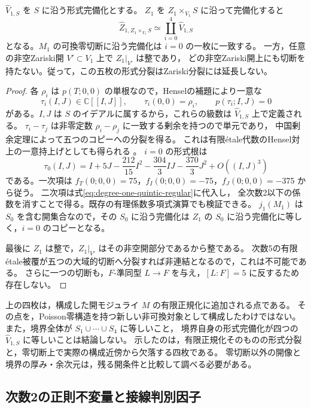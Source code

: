 \begin{corollary}[全零切断に沿う形式分裂]
\label{cor:degree-one-formal-five-splitting}
$\widehat V_{1,S}$ を $S$ に沿う形式完備化とする。
$Z_1$ を $Z_1\times_{V_1}S$ に沿って完備化すると
\[
 \widehat Z_{1,Z_1\times_{V_1}S}
          \simeq\coprod_{i=0}^4\widehat V_{1,S}
\]
となる。$M_1$ の可換零切断に沿う完備化は $i=0$ の一枚に一致する。
一方，任意の非空Zariski開 $V'\subset V_1$ 上で $Z_1|_{V'}$ は整であり，
どの非空Zariski開上にも切断を持たない。従って，この五枚の形式分裂はZariski分裂には延長しない。
\end{corollary}
\begin{proof}
各 $\rho_i$ は $p(T;0,0)$ の単根なので，Henselの補題により一意な
\[
 \tau_i(I,J)\in\mathbb C[[I,J]],\qquad
 \tau_i(0,0)=\rho_i,\qquad p(\tau_i;I,J)=0
\]
がある。$I,J$ は $S$ のイデアルに属するから，これらの級数は
$\widehat V_{1,S}$ 上で定義される。
$\tau_i-\tau_j$ は非零定数 $\rho_i-\rho_j$ に一致する剰余を持つので単元であり，
中国剰余定理によって五つのコピーへの分裂を得る。
これは有限\'{e}tale代数のHensel対上の一意持上げとしても得られる
\cite[Tags 0ALJ, 09ZL]{StacksProject}。
$i=0$ の形式根は
\[
 \tau_0(I,J)=I+5J-\frac{212}{15}I^2-\frac{304}{3}IJ-\frac{370}{3}J^2+O((I,J)^3)
\]
である。一次項は $f_T(0;0,0)=75$，$f_I(0;0,0)=-75$，$f_J(0;0,0)=-375$ から従う。
二次項は式\eqref{eq:degree-one-quintic-regular}に代入し，
全次数2以下の係数を消すことで得る。既存の有理係数多項式演算でも検証できる。
$j_1(M_1)$ は $S_0$ を含む開集合なので，その $S_0$ に沿う完備化は
$Z_1$ の $S_0$ に沿う完備化に等しく，$i=0$ のコピーとなる。

最後に $Z_1$ は整で，$Z_1|_{V'}$ はその非空開部分であるから整である。
次数5の有限\'{e}tale被覆が五つの大域的切断へ分裂すれば非連結となるので，これは不可能である。
さらに一つの切断も，$F$-準同型 $L\to F$ を与え，$[L:F]=5$ に反するため存在しない。
\end{proof}

\begin{remark}[有限正規化の境界としての意味]
上の四枚は，構成した開モジュライ $M$ の有限正規化に追加される点である。
その点を，Poisson零構造を持つ新しい非可換対象として構成したわけではない。
また，境界全体が $S_1\cup\cdots\cup S_4$ に等しいこと，
境界自身の形式完備化が四つの $\widehat V_{1,S}$ に等しいことは結論しない。
示したのは，有限正規化そのものの形式分裂と，零切断上で実際の構成近傍から欠落する四枚である。
零切断以外の開像と境界の厚み・余次元は，残る開条件と比較して調べる必要がある。
\end{remark}

\subsection{次数2の正則不変量と接線判別因子}

